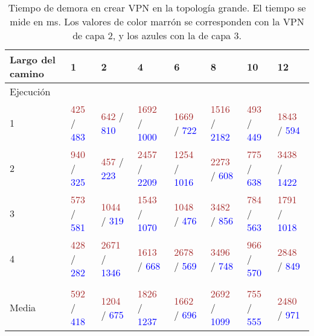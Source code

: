 \begin{table}[!h]
	\scriptsize
	\caption{Tiempo de demora en crear VPN en la topología grande. El tiempo se mide en ms. Los valores de color marrón se corresponden con la VPN de capa 2, y los azules con la de capa 3.}
	\centering 
	\begin{tabular}{p{2.2cm} p{1.4cm} p{1.4cm} p{1.4cm} p{1.4cm} p{1.4cm} p{1.4cm} p{1.4cm}}
		\hline
		Largo del camino & 1 & 2 & 4 & 6 & 8 & 10 & 12 \\ [0.5ex]
		\hline
		Ejecución & & & & & & & \\
		1 & \textcolor{brown}{425} / \textcolor{blue}{483} & \textcolor{brown}{642} / \textcolor{blue}{810} & \textcolor{brown}{1692} / \textcolor{blue}{1000} & \textcolor{brown}{1669} / \textcolor{blue}{722} & \textcolor{brown}{1516} / \textcolor{blue}{2182} & \textcolor{brown}{493} / \textcolor{blue}{449} & \textcolor{brown}{1843} / \textcolor{blue}{594} \\
		2 & \textcolor{brown}{940} / \textcolor{blue}{325} & \textcolor{brown}{457} / \textcolor{blue}{223} & \textcolor{brown}{2457} / \textcolor{blue}{2209} & \textcolor{brown}{1254} / \textcolor{blue}{1016}  & \textcolor{brown}{2273} / \textcolor{blue}{608} & \textcolor{brown}{775} / \textcolor{blue}{638} & \textcolor{brown}{3438} / \textcolor{blue}{1422} \\
		3 & \textcolor{brown}{573} / \textcolor{blue}{581} & \textcolor{brown}{1044} / \textcolor{blue}{319} & \textcolor{brown}{1543} / \textcolor{blue}{1070} & \textcolor{brown}{1048} / \textcolor{blue}{476} & \textcolor{brown}{3482} / \textcolor{blue}{856} & \textcolor{brown}{784} / \textcolor{blue}{563} & \textcolor{brown}{1791} / \textcolor{blue}{1018} \\
		4 & \textcolor{brown}{428} / \textcolor{blue}{282} & \textcolor{brown}{2671} / \textcolor{blue}{1346} & \textcolor{brown}{1613} / \textcolor{blue}{668} & \textcolor{brown}{2678} / \textcolor{blue}{569} & \textcolor{brown}{3496} / \textcolor{blue}{748} & \textcolor{brown}{966} / \textcolor{blue}{570} & \textcolor{brown}{2848} / \textcolor{blue}{849} \\
		& & & & & & & \\
		Media & \textcolor{brown}{592} / \textcolor{blue}{418} & \textcolor{brown}{1204} / \textcolor{blue}{675} & \textcolor{brown}{1826} / \textcolor{blue}{1237} & \textcolor{brown}{1662} / \textcolor{blue}{696} & \textcolor{brown}{2692} / \textcolor{blue}{1099} & \textcolor{brown}{755} / \textcolor{blue}{555} & \textcolor{brown}{2480} / \textcolor{blue}{971} \\

\end{tabular}
\end{table}
